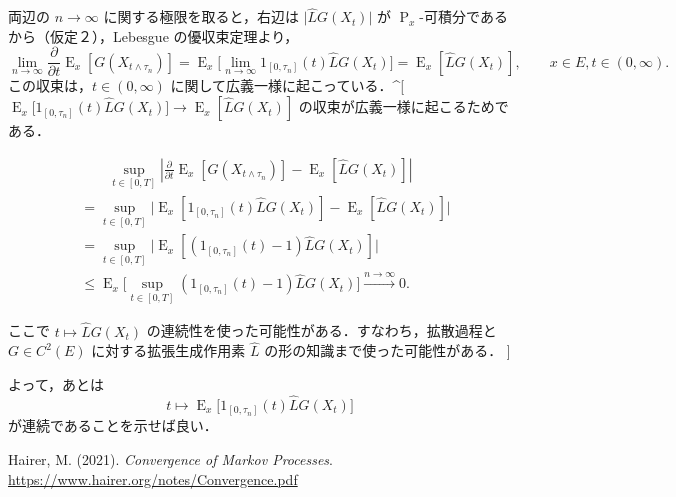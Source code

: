 \documentclass[
  11pt,
]{bxjsarticle}
\newlength{\cslhangindent}
\newenvironment{CSLReferences}[2] %
 {\begin{list}{}{%
  \setlength{\itemindent}{0pt}
  \setlength{\leftmargin}{0pt}
  \setlength{\parsep}{0pt}
  \ifodd #1
   \setlength{\leftmargin}{\cslhangindent}
   \setlength{\itemindent}{-1\cslhangindent}
  \fi
  \setlength{\itemsep}{#2\baselineskip}}}
 {\end{list}}
\begin{document}
\begin{tcolorbox}
両辺の \(n\to\infty\) に関する極限を取ると，右辺は
\(\lvert\widehat{L}G(X_t)\rvert\) が
\(\operatorname{P}_x\)-可積分であるから（仮定２），Lebesgue
の優収束定理より， \[
\lim_{n\to\infty}\frac{\partial }{\partial t}\operatorname{E}_x[G(X_{t\land\tau_n})]=\operatorname{E}_x\biggl[\lim_{n\to\infty}1_{[0,\tau_n]}(t)\widehat{L}G(X_t)\biggr]=\operatorname{E}_x[\widehat{L}G(X_t)],\qquad x\in E,t\in(0,\infty).
\] この収束は，\(t\in(0,\infty)\)
に関して広義一様に起こっている．\^{}{[}\(\operatorname{E}_x\biggl[1_{[0,\tau_n]}(t)\widehat{L}G(X_t)\biggr]\to\operatorname{E}_x[\widehat{L}G(X_t)]\)
の収束が広義一様に起こるためである．

\begin{align*}
&\qquad\sup_{t\in[0,T]}\left|\frac{\partial }{\partial t}\operatorname{E}_x[G(X_{t\land\tau_n})]-\operatorname{E}_x[\widehat{L}G(X_t)]\right|\\
&=\sup_{t\in[0,T]}\biggl|\operatorname{E}_x[1_{[0,\tau_n]}(t)\widehat{L}G(X_t)]-\operatorname{E}_x[\widehat{L}G(X_t)]\biggr|\\
&=\sup_{t\in[0,T]}\biggl|\operatorname{E}_x\left[(1_{[0,\tau_n]}(t)-1)\widehat{L}G(X_t)\right]\biggr|\\
&\le\operatorname{E}_x\biggl[\sup_{t\in[0,T]}\left(1_{[0,\tau_n]}(t)-1\right)\widehat{L}G(X_t)\biggr]\xrightarrow{n\to\infty}0.
\end{align*}

ここで \(t\mapsto\widehat{L}G(X_t)\)
の連続性を使った可能性がある．すなわち，拡散過程と \(G\in C^2(E)\)
に対する拡張生成作用素 \(\widehat{L}\)
の形の知識まで使った可能性がある． {]}

よって，あとは \[
t\mapsto \operatorname{E}_x\biggl[1_{[0,\tau_n]}(t)\widehat{L}G(X_t)\biggr]
\] が連続であることを示せば良い．

\end{tcolorbox}


\label{refs}
\begin{CSLReferences}{1}{0}
Hairer, M. (2021). \emph{Convergence of Markov Processes}.
\url{https://www.hairer.org/notes/Convergence.pdf}

\end{CSLReferences}
\end{document}
